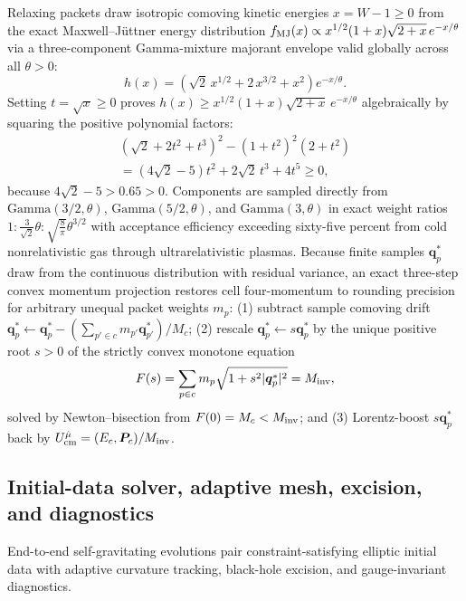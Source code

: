 Relaxing packets draw isotropic comoving kinetic energies $x = W - 1 \ge 0$ from the exact Maxwell--J\"uttner energy distribution $f_{\rm MJ}(x) \propto x^{1/2}(1+x)\sqrt{2+x}\,e^{-x/\theta}$ via a three-component Gamma-mixture majorant envelope valid globally across all $\theta > 0$:
\begin{equation}\label{eq:mj_majorant}
h(x) = \left(\sqrt{2}\,x^{1/2} + 2\,x^{3/2} + x^2\right)e^{-x/\theta}.
\end{equation}
Setting $t = \sqrt{x} \ge 0$ proves $h(x) \ge x^{1/2}(1+x)\sqrt{2+x}\,e^{-x/\theta}$ algebraically by squaring the positive polynomial factors:
\begin{multline}\label{eq:mj_proof}
\left(\sqrt{2} + 2t^2 + t^3\right)^2 - (1 + t^2)^2(2 + t^2) \\
= (4\sqrt{2} - 5)t^2 + 2\sqrt{2}\,t^3 + 4t^5 \ge 0,
\end{multline}
because $4\sqrt{2} - 5 > 0.65 > 0$. Components are sampled directly from $\mathrm{Gamma}(3/2,\theta)$, $\mathrm{Gamma}(5/2,\theta)$, and $\mathrm{Gamma}(3,\theta)$ in exact weight ratios $1 : \frac{3}{\sqrt{2}}\theta : \sqrt{\frac{8}{\pi}}\theta^{3/2}$ with acceptance efficiency exceeding sixty-five percent from cold nonrelativistic gas through ultrarelativistic plasmas. Because finite samples $\bm{q}_p^*$ draw from the continuous distribution with residual variance, an exact three-step convex momentum projection restores cell four-momentum to rounding precision for arbitrary unequal packet weights $m_p$: (1) subtract sample comoving drift $\bm{q}_p^* \leftarrow \bm{q}_p^* - (\sum_{p'\in c} m_{p'}\bm{q}_{p'}^*)/M_c$; (2) rescale $\bm{q}_p^* \leftarrow s\bm{q}_p^*$ by the unique positive root $s > 0$ of the strictly convex monotone equation
\begin{equation}\label{eq:proj_convex}
F(s) = \sum_{p\in c} m_p \sqrt{1 + s^2 |\bm{q}_p^*|^2} = M_{\rm inv},
\end{equation}
solved by Newton--bisection from $F(0) = M_c < M_{\rm inv}$; and (3) Lorentz-boost $s\bm{q}_p^*$ back by $U_{\rm cm}^{\hat{\mu}} = (E_c, \bm{P}_c)/M_{\rm inv}$.

\subsection{Initial-data solver, adaptive mesh, excision, and diagnostics}\label{sec:method_numerical}

End-to-end self-gravitating evolutions pair constraint-satisfying elliptic initial data with adaptive curvature tracking, black-hole excision, and gauge-invariant diagnostics.

